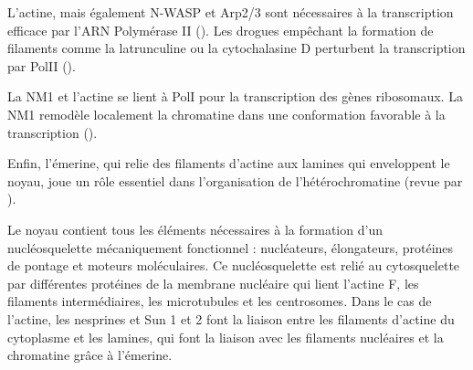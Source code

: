 L'actine, mais également N-WASP et Arp2/3 sont nécessaires à la transcription efficace par l'ARN Polymérase II (\cite{yoo_novel_2006}). Les drogues empêchant la formation de filaments comme la latrunculine ou la cytochalasine D perturbent la transcription par PolII (\cite{mcdonald_nucleoplasmic_2006}).

La NM1 et l'actine se lient à PolI pour la transcription des gènes ribosomaux. La NM1 remodèle localement la chromatine dans une conformation favorable à la transcription (\cite{nowak_evidence_1997}).

Enfin, l'émerine, qui relie des filaments d'actine aux lamines qui enveloppent le noyau, joue un rôle essentiel dans l'organisation de l'hétérochromatine (revue par \cite{gieni_actin_2009}). 


Le noyau contient tous les éléments nécessaires à la formation d'un nucléosquelette mécaniquement fonctionnel : nucléateurs, élongateurs, protéines de pontage et moteurs moléculaires. 
Ce nucléosquelette est relié au cytosquelette par différentes protéines de la membrane nucléaire qui lient l'actine F, les filaments intermédiaires, les microtubules et les centrosomes. 
Dans le cas de l'actine, les nesprines et Sun 1 et 2 font la liaison entre les filaments d'actine du cytoplasme et les lamines, qui font la liaison avec les filaments nucléaires et la chromatine grâce à l'émerine. 





%